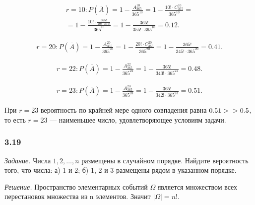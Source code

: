 \documentclass{book}
\begin{document}
\begin{equation*}
\begin{split}
r = 10 :
P \left( \overline{A} \right) =
1 - \frac{A_{365}^{10}}{365^{10}} =
1- \frac{10! \cdot C_{365}^{10}}{365^{10}} = \\
= 1 - \frac{10! \cdot \frac{365!}{10! \cdot 355!}}{365^{10}} =
1 - \frac{365!}{355! \cdot 365^{10}} =
0.12.
\end{split}
\end{equation*}

\begin{equation*}
\begin{split}
r = 20 :
P \left( \overline{A} \right) =
1 - \frac{A_{365}^{20}}{365^{20}} =
1 - \frac{20! \cdot C_{365}^{20}}{365^{20}} =
1 - \frac{365!}{345! \cdot 365^{20}} =
0.41.
\end{split}
\end{equation*}

\begin{equation*}
\begin{split}
r = 22 :
P \left( \overline{A} \right) =
1 - \frac{A_{365}^{22}}{365^{22}} =
1 - \frac{365!}{343! \cdot 365^{22}} =
0.48.
\end{split}
\end{equation*}

\begin{equation*}
\begin{split}
r = 23 :
P \left( \overline{A} \right) =
1 - \frac{A_{365}^{23}}{365^{23}} =
1 - \frac{365!}{342! \cdot 365^{23}} =
0.51.
\end{split}
\end{equation*}

При
$ r = 23 $
вероятность по крайней мере одного совпадения равна
$ 0.51 > \\
> 0.5 $,
то есть
$ r = 23 $ ---
наименьшее число, удовлетворяющее условиям задачи.

\subsubsection*{3.19}

\textit{Задание.} Числа $ 1, 2,  \dotsc , n $ размещены в случайном порядке.
Найдите вероятность того, что числа:
а) 1 и 2;
б) 1, 2 и 3 размещены рядом в указанном порядке.

\textit{Решение.} Пространство элементарных событий $  \Omega$ является множеством всех перестановок множества из n элементов.
Значит $ |\Omega| = n! $.
\end{document}
